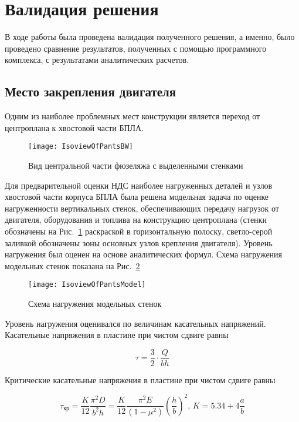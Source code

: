 \section{Валидация решения}
В ходе работы была проведена валидация полученного решения, а именно, было проведено сравнение результатов, полученных с помощью программного комплекса, с результатами аналитических расчетов. 

\subsection{Место закрепления двигателя}

Одним из наиболее проблемных мест конструкции является переход от центроплана к хвостовой части БПЛА. 

\begin{figure}[h]
\centering
\texttt{[image: IsoviewOfPantsBW]}
\caption{Вид центральной части фюзеляжа с выделенными стенками}
\label{IsoviewOfPants}
\end{figure}

Для предварительной оценки НДС наиболее нагруженных деталей и узлов хвостовой части корпуса БПЛА была решена модельная задача по оценке нагруженности вертикальных стенок, обеспечивающих передачу нагрузок от двигателя, оборудования и топлива на конструкцию центроплана (стенки обозначены на Рис.~\ref{IsoviewOfPants} раскраской в горизонтальную полоску, светло-серой заливкой обозначены зоны основных узлов крепления двигателя). Уровень нагружения был оценен на основе аналитических формул. Схема нагружения модельных стенок показана на Рис.~\ref{IsoviewOfPantsModel}

\begin{figure}[h]
\centering
\texttt{[image: IsoviewOfPantsModel]}
\caption{Схема нагружения модельных стенок}
\label{IsoviewOfPantsModel}
\end{figure}


Уровень нагружения оценивался по величинам касательных напряжений. Касательные напряжения в пластине при чистом сдвиге равны

\begin{equation}
\tau=\frac{3}{2}\cdot\frac{Q}{bh}
\end{equation}

Критические касательные напряжения в пластине при чистом сдвиге равны

\begin{equation}
\tau_\text{кр}=\frac{K}{12}\frac{\pi^2D}{b^2h} = \frac{K}{12}\frac{\pi^2E}{(1-\mu^2)}\left(\frac{h}{b}\right)^2,\, K=5.34 + 4\frac{a}{b}
\end{equation}

